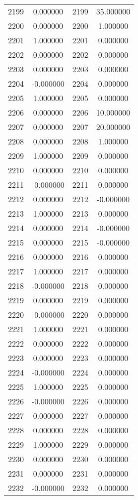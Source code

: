 \documentclass[12pt]{article}
\begin{document}
\begin{longtable}{@{}cccc@{}}
2199 & 0.000000 & 2199 & 35.000000 \\
2200 & 0.000000 & 2200 & 1.000000 \\
2201 & 1.000000 & 2201 & 0.000000 \\
2202 & 0.000000 & 2202 & 0.000000 \\
2203 & 0.000000 & 2203 & 0.000000 \\
2204 & -0.000000 & 2204 & 0.000000 \\
2205 & 1.000000 & 2205 & 0.000000 \\
2206 & 0.000000 & 2206 & 10.000000 \\
2207 & 0.000000 & 2207 & 20.000000 \\
2208 & 0.000000 & 2208 & 1.000000 \\
2209 & 1.000000 & 2209 & 0.000000 \\
2210 & 0.000000 & 2210 & 0.000000 \\
2211 & -0.000000 & 2211 & 0.000000 \\
2212 & 0.000000 & 2212 & -0.000000 \\
2213 & 1.000000 & 2213 & 0.000000 \\
2214 & 0.000000 & 2214 & -0.000000 \\
2215 & 0.000000 & 2215 & -0.000000 \\
2216 & 0.000000 & 2216 & 0.000000 \\
2217 & 1.000000 & 2217 & 0.000000 \\
2218 & -0.000000 & 2218 & 0.000000 \\
2219 & 0.000000 & 2219 & 0.000000 \\
2220 & -0.000000 & 2220 & 0.000000 \\
2221 & 1.000000 & 2221 & 0.000000 \\
2222 & 0.000000 & 2222 & 0.000000 \\
2223 & 0.000000 & 2223 & 0.000000 \\
2224 & -0.000000 & 2224 & 0.000000 \\
2225 & 1.000000 & 2225 & 0.000000 \\
2226 & -0.000000 & 2226 & 0.000000 \\
2227 & 0.000000 & 2227 & 0.000000 \\
2228 & 0.000000 & 2228 & 0.000000 \\
2229 & 1.000000 & 2229 & 0.000000 \\
2230 & 0.000000 & 2230 & 0.000000 \\
2231 & 0.000000 & 2231 & 0.000000 \\
2232 & -0.000000 & 2232 & 0.000000 \\

\end{longtable}
\end{document}
